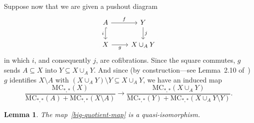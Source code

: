 \documentclass[a4paper, 11 pt, oneside, reqno]{amsart}
\newtheorem{lemma}{Lemma}
\numberwithin{lemma}{section}
\theoremstyle{definition}
\newcommand{\MC}{\mathrm{MC}}
\begin{document}
Suppose now that we are given a pushout diagram
\[\begin{tikzcd}
    A \arrow{r}{f} \arrow[hook,d,"i"'] & Y \arrow{d}{j} \\
    X \arrow[r,"g"'] & X \cup_A Y
\end{tikzcd}\]
in which $i$, and consequently $j$, are cofibrations.
Since the square commutes, 
$g$ sends $A\subseteq X$ into $Y\subseteq X\cup_A Y$.
And since (by construction---see Lemma~2.10 of~\cite{CDKOSW}) 
$g$ identifies 
$X\setminus A$ with  $(X\cup_A Y)\setminus Y\subseteq X\cup_A Y$, 
we have an induced map 
\begin{equation}\label{big-quotient-map}
    \frac{\MC_{\ast,\ast}(X)}
    {\MC_{\ast,\ast}(A)+\MC_{\ast,\ast}(X\setminus A)}
    \longrightarrow
    \frac{\MC_{\ast,\ast}(X\cup_A Y)}
    {\MC_{\ast,\ast}(Y)+\MC_{\ast,\ast}(X\cup_A Y \setminus Y)}.
\end{equation}

\begin{lemma}\label{big-quotient-quasi-isomorphism}
    The map~\eqref{big-quotient-map}
    is a quasi-isomorphism.
\end{lemma}
\end{document}

